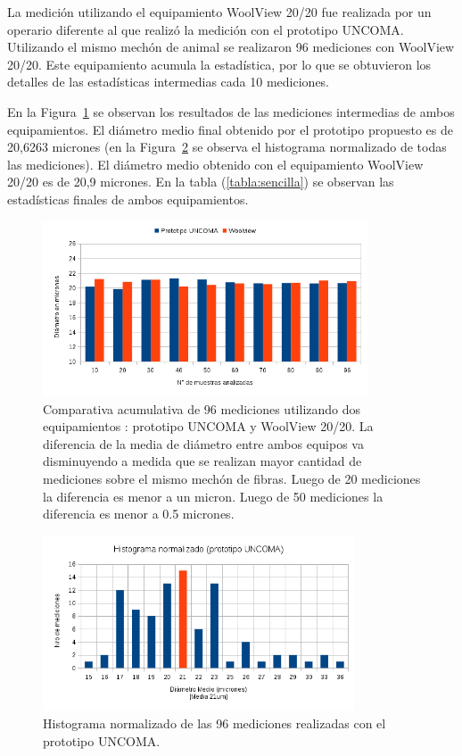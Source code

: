 \documentclass[runningheads,a4paper]{llncs}
\begin{document}
La medición utilizando el equipamiento WoolView 20/20 fue realizada por un operario diferente al que realizó la medición con el prototipo UNCOMA. Utilizando el mismo mechón de animal se realizaron 96 mediciones con WoolView 20/20. Este equipamiento acumula la estadística, por lo que se obtuvieron los detalles de las estadísticas intermedias cada 10 mediciones. 

En la Figura~\ref{fig:prototipovswv} se observan los resultados de las mediciones intermedias de ambos equipamientos.
El diámetro medio final obtenido por el prototipo propuesto es de 20,6263 micrones (en la Figura~\ref{fig:histograma} se observa el histograma normalizado de todas las mediciones). El diámetro medio obtenido con el equipamiento WoolView 20/20 es de 20,9 micrones. En la tabla (\ref{tabla:sencilla}) se observan las estadísticas finales de ambos equipamientos.

\begin{figure}
\centering
\includegraphics[height=5.2cm]{prototipovswv}
\caption{\small Comparativa acumulativa de 96 mediciones utilizando dos equipamientos : prototipo UNCOMA y WoolView 20/20.
La diferencia de la media de diámetro entre ambos equipos va disminuyendo a medida que se realizan mayor cantidad de mediciones sobre el mismo mechón de fibras. Luego de 20 mediciones la diferencia es menor a un micron. Luego de 50 mediciones la diferencia es menor a 0.5 micrones.}
\label{fig:prototipovswv}
\end{figure}

\begin{figure}
\centering
\includegraphics[height=5.2cm]{histograma}
\caption{Histograma normalizado de las 96 mediciones realizadas con el prototipo UNCOMA.}
\label{fig:histograma}
\end{figure}
\end{document}
